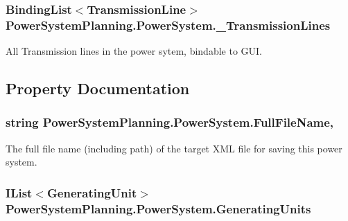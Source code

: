 \subsubsection[{\texorpdfstring{\+\_\+\+Transmission\+Lines}{_TransmissionLines}}]{\setlength{\rightskip}{0pt plus 5cm}Binding\+List$<${\bf Transmission\+Line}$>$ Power\+System\+Planning.\+Power\+System.\+\_\+\+Transmission\+Lines}\hypertarget{class_power_system_planning_1_1_power_system_a88e97e6852c0105b86408ff9753163ba}{}\label{class_power_system_planning_1_1_power_system_a88e97e6852c0105b86408ff9753163ba}


All Transmission lines in the power sytem, bindable to G\+UI. 



\subsection{Property Documentation}
\subsubsection[{\texorpdfstring{Full\+File\+Name}{FullFileName}}]{\setlength{\rightskip}{0pt plus 5cm}string Power\+System\+Planning.\+Power\+System.\+Full\+File\+Name\hspace{0.3cm}{\ttfamily [get]}, {\ttfamily [set]}}\hypertarget{class_power_system_planning_1_1_power_system_abf9f7281d0dd5e23a567c6ddef5f8b91}{}\label{class_power_system_planning_1_1_power_system_abf9f7281d0dd5e23a567c6ddef5f8b91}


The full file name (including path) of the target X\+ML file for saving this power system. 

\subsubsection[{\texorpdfstring{Generating\+Units}{GeneratingUnits}}]{\setlength{\rightskip}{0pt plus 5cm}I\+List$<${\bf Generating\+Unit}$>$ Power\+System\+Planning.\+Power\+System.\+Generating\+Units\hspace{0.3cm}{\ttfamily [get]}}\hypertarget{class_power_system_planning_1_1_power_system_aee8ba3b28d3f43e64484359f71cb35fd}{}\label{class_power_system_planning_1_1_power_system_aee8ba3b28d3f43e64484359f71cb35fd}


